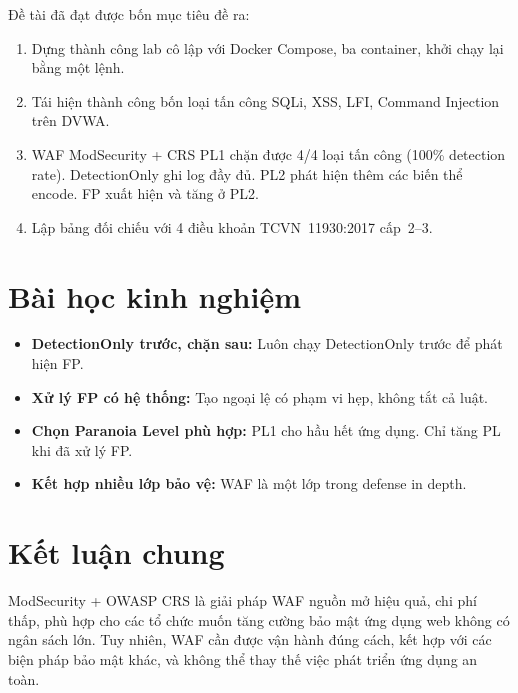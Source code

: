 \documentclass[12pt,a4paper,twoside]{report}
\begin{document}
Đề tài đã đạt được bốn mục tiêu đề ra:
\begin{enumerate}
    \item Dựng thành công lab cô lập với Docker Compose, ba container, khởi chạy lại bằng một lệnh.
    \item Tái hiện thành công bốn loại tấn công SQLi, XSS, LFI, Command Injection trên DVWA.
    \item WAF ModSecurity + CRS PL1 chặn được 4/4 loại tấn công (100\% detection rate). DetectionOnly ghi log đầy đủ. PL2 phát hiện thêm các biến thể encode. FP xuất hiện và tăng ở PL2.
    \item Lập bảng đối chiếu với 4 điều khoản TCVN~11930:2017 cấp~2--3.
\end{enumerate}

\section{Bài học kinh nghiệm}

\begin{itemize}
    \item \textbf{DetectionOnly trước, chặn sau:} Luôn chạy DetectionOnly trước để phát hiện FP.
    \item \textbf{Xử lý FP có hệ thống:} Tạo ngoại lệ có phạm vi hẹp, không tắt cả luật.
    \item \textbf{Chọn Paranoia Level phù hợp:} PL1 cho hầu hết ứng dụng. Chỉ tăng PL khi đã xử lý FP.
    \item \textbf{Kết hợp nhiều lớp bảo vệ:} WAF là một lớp trong defense in depth.
\end{itemize}

\section{Kết luận chung}

ModSecurity + OWASP CRS là giải pháp WAF nguồn mở hiệu quả, chi phí thấp, phù hợp cho các tổ chức muốn tăng cường bảo mật ứng dụng web không có ngân sách lớn. Tuy nhiên, WAF cần được vận hành đúng cách, kết hợp với các biện pháp bảo mật khác, và không thể thay thế việc phát triển ứng dụng an toàn.

\renewcommand{\bibname}{TÀI LIỆU THAM KHẢO}
\nocite{*}
\printbibliography[heading=bibintoc]
\end{document}
